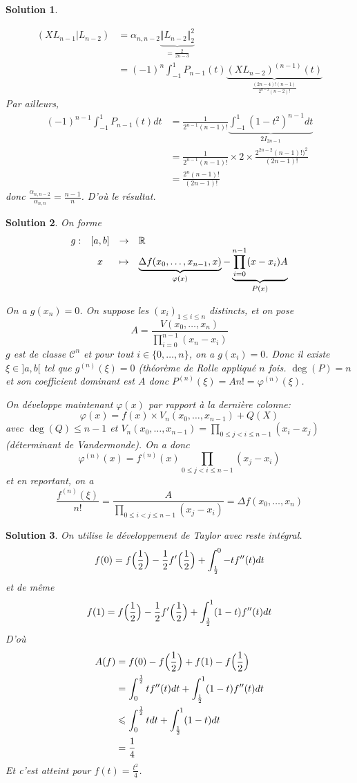 \documentclass[12pt]{article}
\newtheorem{solution}{Solution}[section]
\theoremstyle{remark}
\newcommand{\function}[5]{
	$$
	\begin{array}{rccl}
		#1: & #2 & \to & #3 \\
		& #4 & \mapsto & #5
	\end{array}
	$$
}
\numberwithin{equation}{section}
\begin{document}
\begin{solution}
\begin{enumerate}
		\begin{align*}
			(XL_{n-1}|L_{n-2})
			&=\alpha_{n,n-2}\underbrace{\Vert L_{n-2}\Vert_{2}^{2}}_{=\frac{2}{2n-3}}\\
			&=(-1)^{n}\int_{-1}^{1}P_{n-1}(t)\underbrace{(XL_{n-2})^{(n-1)}(t)}_{\frac{(2n-4)!(n-1)}{2^{n-2}(n-2)!}}
		\end{align*}
		Par ailleurs,
		\begin{align*}
			(-1)^{n-1}\int_{-1}^{1}P_{n-1}(t)dt
			&=\frac{1}{2^{n-1}(n-1)!}\underbrace{\int_{-1}^{1}(1-t^{2})^{n-1}dt}_{2I_{2n-1}}\\
			&=\frac{1}{2^{n-1}(n-1)!}\times 2\times\frac{2^{2n-2}(n-1)!)^{2}}{(2n-1)!}\\
			&=\frac{2^{n}(n-1)!}{(2n-1)!}
		\end{align*}
		donc $\frac{\alpha_{n,n-2}}{\alpha_{n,n}}=\frac{n-1}{n}$. D'où le résultat.
	\end{enumerate}
\end{solution}

\begin{solution}
	On forme \function{g}{[a,b]}{\R}{x}{\underbrace{\Delta f(x_{0},\dots,x_{n-1},x)}_{\varphi(x)}-\underbrace{\prod_{i=0}^{n-1}(x-x_{i})A}_{P(x)}}
	On a $g(x_{n})=0$. On suppose les $(x_{i})_{1\leqslant i\leqslant n}$ distincts, et on pose 
	$$A=\frac{V(x_{0},\dots,x_{n})}{\prod_{i=0}^{n-1}(x_{n}-x_{i})}$$
	$g$ est de classe $\mathcal{C}^{n}$ et pour tout $i\in\{0,\dots,n\}$, on a $g(x_{i})=0$.
	Donc il existe $\xi\in]a,b[$ tel que $g^{(n)}(\xi)=0$ (théorème de Rolle appliqué $n$ fois. $\deg(P)=n$ et son coefficient dominant est $A$ donc $P^{(n)}(\xi)=An!=\varphi^{(n)}(\xi)$.

	On développe maintenant $\varphi(x)$ par rapport à la dernière colonne:
	$$\varphi(x)=f(x)\times V_{n}(x_{0},\dots,x_{n-1})+Q(X)$$
	avec $\deg(Q)\leqslant n-1$ et $V_{n}(x_{0},\dots,x_{n-1})=\prod_{0\leqslant j<i\leqslant n-1}(x_{i}-x_{j})$ (déterminant de Vandermonde). On a donc 
	$$\varphi^{(n)}(x)=f^{(n)}(x)\prod_{0\leqslant j<i\leqslant n-1}(x_{j}-x_{i})$$
	et en reportant, on a 
	$$\frac{f^{(n)}(\xi)}{n!}=\frac{A}{\prod_{0\leqslant i<j\leqslant n-1}(x_{j}-x_{i})}=\Delta f(x_{0},\dots,x_{n})$$
\end{solution}

\begin{solution}
	On utilise le développement de Taylor avec reste intégral.
	$$f(0)=f\Bigl(\frac{1}{2}\Bigr)-\frac{1}{2}f'\Bigl(\frac{1}{2}\Bigr)+\int_{\frac{1}{2}}^{0}-tf''(t)dt$$
	et de même
	$$f(1)=f\Bigl(\frac{1}{2}\Bigr)-\frac{1}{2}f'\Bigl(\frac{1}{2}\Bigr)+\int_{\frac{1}{2}}^{1}(1-t)f''(t)dt$$
	D'où
	\begin{align*}
		A(f)
		&=f(0)-f\Bigl(\frac{1}{2}\Bigr)+f(1)-f\Bigl(\frac{1}{2}\Bigr)\\
		&=\int_{0}^{\frac{1}{2}}tf''(t)dt+\int_{\frac{1}{2}}^{1}(1-t)f''(t)dt\\
		&\leqslant\int_{0}^{\frac{1}{2}}tdt+\int_{\frac{1}{2}}^{1}(1-t)dt\\
		&=\frac{1}{4}
	\end{align*}
	Et c'est atteint pour $f(t)=\frac{t^{2}}{4}$.
\end{solution}
\end{document}
